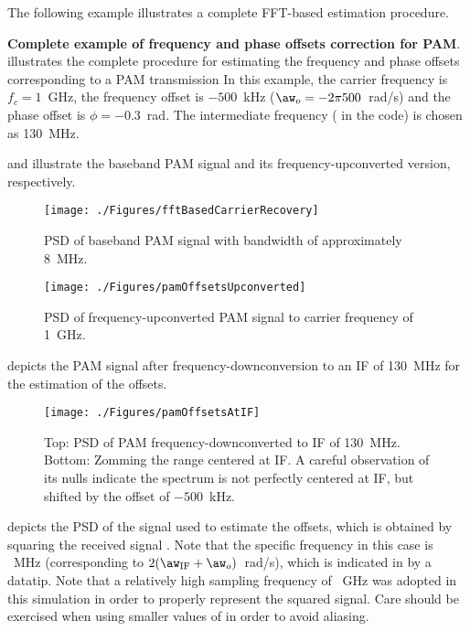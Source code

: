 The following example illustrates a complete FFT-based estimation procedure.

\bExample \textbf{Complete example of frequency and phase offsets correction for PAM}.
\label{ex:offsetsPAM}
 illustrates the complete procedure for 
estimating the frequency and phase offsets corresponding to a PAM transmission
In this example, the carrier frequency is $f_c=1$~GHz, the frequency offset is
$-500$~kHz ($\aw_o = -2 \pi 500$~rad/s) and the phase offset is $\phi=-0.3$~rad.
The intermediate frequency ( in the code) is chosen as 130~MHz.



 and  illustrate the 
baseband PAM signal and its frequency-upconverted version, respectively. 

\begin{figure}[htbp]
\centering
\texttt{[image: ./Figures/fftBasedCarrierRecovery]}
\caption{PSD of baseband PAM signal with bandwidth of approximately 8~MHz.\label{fig:fftBasedCarrierRecovery}}
\end{figure}

\begin{figure}[htbp]
\centering
\texttt{[image: ./Figures/pamOffsetsUpconverted]}
\caption{PSD of frequency-upconverted PAM signal to carrier frequency of 1~GHz.\label{fig:pamOffsetsUpconverted}}
\end{figure}

 depicts the PAM signal after frequency-downconversion to an IF
of 130~MHz for the estimation of the offsets.

\begin{figure}[htbp]
\centering
\texttt{[image: ./Figures/pamOffsetsAtIF]}
\caption[PSDs of PAM frequency-downconverted to IF.]{Top: PSD of PAM frequency-downconverted to IF of 130~MHz. Bottom: Zomming the range centered at IF. A careful observation of its nulls indicate the spectrum is not perfectly centered at IF, but shifted by the offset of $-500$~kHz.\label{fig:pamOffsetsAtIF}}
\end{figure}

 depicts the PSD of the signal used to estimate the offsets, which is obtained by squaring the received signal . Note that the specific frequency in this case is
~MHz (corresponding to $2(\aw_{\textrm{IF}} + \aw_o)$~rad/s), which is
indicated in  by a datatip. Note that a relatively high sampling frequency
of ~GHz was adopted in this simulation in order to properly represent the squared
signal. Care should be exercised when using smaller values of  in order to avoid 
aliasing.


